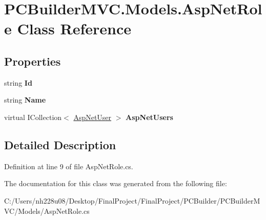 \hypertarget{class_p_c_builder_m_v_c_1_1_models_1_1_asp_net_role}{}\section{P\+C\+Builder\+M\+V\+C.\+Models.\+Asp\+Net\+Role Class Reference}
\label{class_p_c_builder_m_v_c_1_1_models_1_1_asp_net_role}
\subsection*{Properties}
\begin{DoxyCompactItemize}
\item 
string {\bfseries Id}\hypertarget{class_p_c_builder_m_v_c_1_1_models_1_1_asp_net_role_a06103ace45910d89ab2a844dd4ceefbe}{}\label{class_p_c_builder_m_v_c_1_1_models_1_1_asp_net_role_a06103ace45910d89ab2a844dd4ceefbe}

\item 
string {\bfseries Name}\hypertarget{class_p_c_builder_m_v_c_1_1_models_1_1_asp_net_role_a027709b9d667d4d19f208f24e4fcdc03}{}\label{class_p_c_builder_m_v_c_1_1_models_1_1_asp_net_role_a027709b9d667d4d19f208f24e4fcdc03}

\item 
virtual I\+Collection$<$ \hyperlink{class_p_c_builder_m_v_c_1_1_models_1_1_asp_net_user}{Asp\+Net\+User} $>$ {\bfseries Asp\+Net\+Users}\hypertarget{class_p_c_builder_m_v_c_1_1_models_1_1_asp_net_role_acee25350de7a4524f3d075d7f214ea31}{}\label{class_p_c_builder_m_v_c_1_1_models_1_1_asp_net_role_acee25350de7a4524f3d075d7f214ea31}

\end{DoxyCompactItemize}


\subsection{Detailed Description}


Definition at line 9 of file Asp\+Net\+Role.\+cs.



The documentation for this class was generated from the following file\+:\begin{DoxyCompactItemize}
\item 
C\+:/\+Users/nh228u08/\+Desktop/\+Final\+Project/\+Final\+Project/\+P\+C\+Builder/\+P\+C\+Builder\+M\+V\+C/\+Models/Asp\+Net\+Role.\+cs\end{DoxyCompactItemize}
